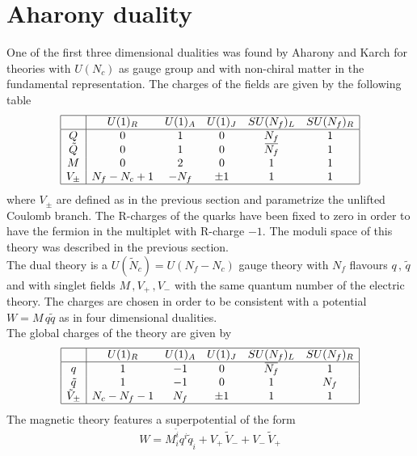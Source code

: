 \section{Aharony duality }
One of the first three dimensional dualities was found by Aharony \cite{Aharony:1997gp} and Karch \cite{Karch:1997ux} for theories with $U(N_c) $ as gauge group and with non-chiral matter in the fundamental representation.
The charges of the fields are given by the following table
\begin{equation}
\begin{array}{ | c | c c c c c |}
\hline
  & U(1)_R & U(1)_A & U(1)_J  & SU(N_f)_L & SU(N_f)_R \\
 \hline
 Q & 0 & 1& 0 & N_f& 1 \\ 
 \tilde{Q} & 0  & 1&0 & \overbar{N_f}&1  \\  
   M & 0 & 2 & 0 & 1 & 1 \\ 
  V_{\pm} & N_f - N_c + 1 & - N_f  & \pm 1 &  1 & 1 \\
  \hline
\end{array}
\end{equation}
where $V_{\pm} $ are defined as in the previous section and parametrize the unlifted Coulomb branch.
The R-charges of the quarks have been fixed to zero in order to have the fermion in the multiplet with R-charge $-1$.
The moduli space of this theory was described in the previous section.
\\
The dual theory is a $U(\tilde{N}_c) = U(N_f - N_c) $ gauge theory with $N_f$ flavours $q\, ,\, \tilde{q}$ and with singlet fields  $M \,,  V_+ \, , V_-$ with the same quantum number of the electric theory. 
The charges are chosen in order to be consistent with a potential $W = M \, q \tilde{q}$ as in four dimensional dualities.\\
The global charges of the theory are given by
\begin{equation}
\begin{array}{ | c | c c c c c | }
\hline
  & U(1)_R & U(1)_A & U(1)_J  & SU(N_f)_L & SU(N_f)_R \\
 \hline
 q & 1 & -1 & 0 & \overbar{N_f} & 1 \\  
 \tilde{q}& 1  & -1 & 0  & 1 & {N_f}  \\  
 \tilde{V}_{\pm} & N_c - N_f -1 & N_f  & \pm 1 &  1 & 1 \\
 \hline
\end{array}
\end{equation}
The magnetic theory features a superpotential of the form
\begin{equation}
W = M^{\tilde{i}}_i q^i \tilde{q}_{\tilde{i}} + V_+ \, \tilde{V}_- + V_- \, \tilde{V}_+
\label{eqn:aharony_mag_superpotential}
\end{equation}
